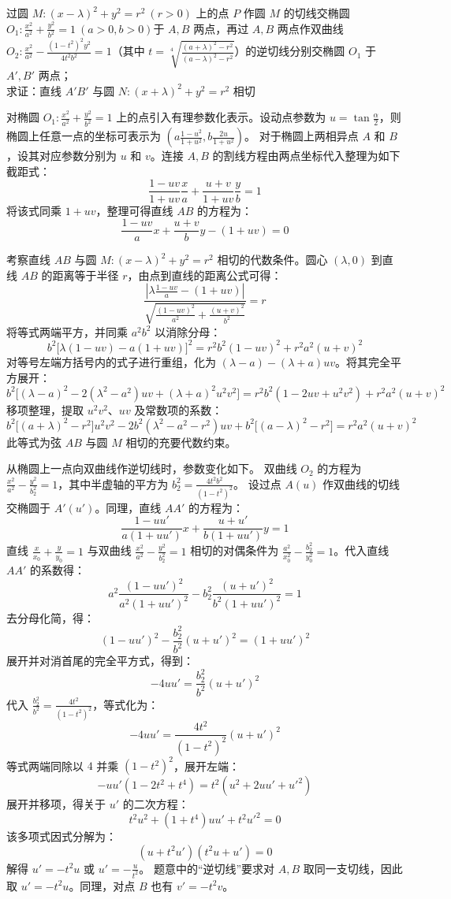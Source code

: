 \begin{exercise}
过圆 \(M: (x - \lambda)^2 + y^2 = r^2\ (r > 0)\) 上的点 \(P\) 作圆 \(M\) 的切线交椭圆$O_1: \frac{x^2}{a^2} + \frac{y^2}{b^2} = 1\ (a > 0, b > 0)$于 \(A,B\) 两点，再过 \(A,B\) 两点作双曲线$O_2: \frac{x^2}{a^2} - \frac{(1 - t^2)^2 y^2}{4 t^2 b^2} = 1$（其中 \(t = \sqrt[4]{\frac{(a + \lambda)^2 - r^2}{(a - \lambda)^2 - r^2}}\)）的逆切线分别交椭圆 \(O_1\) 于 \(A',B'\) 两点；\\
求证：直线 \(A'B'\) 与圆 \(N: (x + \lambda)^2 + y^2 = r^2\) 相切
\end{exercise}
\begin{solution}
对椭圆 $O_1: \frac{x^2}{a^2} + \frac{y^2}{b^2} = 1$ 上的点引入有理参数化表示。设动点参数为 $u = \tan\frac{\alpha}{2}$，则椭圆上任意一点的坐标可表示为 $\left( a\frac{1-u^2}{1+u^2}, b\frac{2u}{1+u^2} \right)$。
对于椭圆上两相异点 $A$ 和 $B$，设其对应参数分别为 $u$ 和 $v$。连接 $A, B$ 的割线方程由两点坐标代入整理为如下截距式：
\[ \frac{1-uv}{1+uv} \frac{x}{a} + \frac{u+v}{1+uv} \frac{y}{b} = 1 \]
将该式同乘 $1+uv$，整理可得直线 $AB$ 的方程为：
\[ \frac{1-uv}{a} x + \frac{u+v}{b} y - (1+uv) = 0 \]

考察直线 $AB$ 与圆 $M: (x - \lambda)^2 + y^2 = r^2$ 相切的代数条件。圆心 $(\lambda, 0)$ 到直线 $AB$ 的距离等于半径 $r$，由点到直线的距离公式可得：
\[ \frac{\left| \lambda \frac{1-uv}{a} - (1+uv) \right|}{\sqrt{\frac{(1-uv)^2}{a^2} + \frac{(u+v)^2}{b^2}}} = r \]
将等式两端平方，并同乘 $a^2 b^2$ 以消除分母：
\[ b^2 \big[ \lambda(1-uv) - a(1+uv) \big]^2 = r^2 b^2 (1-uv)^2 + r^2 a^2 (u+v)^2 \]
对等号左端方括号内的式子进行重组，化为 $(\lambda-a) - (\lambda+a)uv$。将其完全平方展开：
\[ b^2 \big[ (\lambda-a)^2 - 2(\lambda^2-a^2)uv + (\lambda+a)^2 u^2 v^2 \big] = r^2 b^2 (1 - 2uv + u^2 v^2) + r^2 a^2 (u+v)^2 \]
移项整理，提取 $u^2v^2$、$uv$ 及常数项的系数：
\[ b^2 \big[ (a+\lambda)^2 - r^2 \big] u^2 v^2 - 2b^2(\lambda^2-a^2-r^2) uv + b^2 \big[ (a-\lambda)^2 - r^2 \big] = r^2 a^2 (u+v)^2 \]
此等式为弦 $AB$ 与圆 $M$ 相切的充要代数约束。

从椭圆上一点向双曲线作逆切线时，参数变化如下。
双曲线 $O_2$ 的方程为 $\frac{x^2}{a^2} - \frac{y^2}{b_2^2} = 1$，其中半虚轴的平方为 $b_2^2 = \frac{4t^2 b^2}{(1-t^2)^2}$。
设过点 $A(u)$ 作双曲线的切线交椭圆于 $A'(u')$。同理，直线 $AA'$ 的方程为：
\[ \frac{1-uu'}{a(1+uu')} x + \frac{u+u'}{b(1+uu')} y = 1 \]
直线 $\frac{x}{x_0} + \frac{y}{y_0} = 1$ 与双曲线 $\frac{x^2}{a^2} - \frac{y^2}{b_2^2} = 1$ 相切的对偶条件为 $\frac{a^2}{x_0^2} - \frac{b_2^2}{y_0^2} = 1$。代入直线 $AA'$ 的系数得：
\[ a^2 \frac{(1-uu')^2}{a^2(1+uu')^2} - b_2^2 \frac{(u+u')^2}{b^2(1+uu')^2} = 1 \]
去分母化简，得：
\[ (1-uu')^2 - \frac{b_2^2}{b^2}(u+u')^2 = (1+uu')^2 \]
展开并对消首尾的完全平方式，得到：
\[ -4uu' = \frac{b_2^2}{b^2} (u+u')^2 \]
代入 $\frac{b_2^2}{b^2} = \frac{4t^2}{(1-t^2)^2}$，等式化为：
\[ -4uu' = \frac{4t^2}{(1-t^2)^2} (u+u')^2 \]
等式两端同除以 $4$ 并乘 $(1-t^2)^2$，展开左端：
\[ -uu' (1 - 2t^2 + t^4) = t^2 (u^2 + 2uu' + u'^2) \]
展开并移项，得关于 $u'$ 的二次方程：
\[ t^2 u^2 + (1+t^4) uu' + t^2 u'^2 = 0 \]
该多项式因式分解为：
\[ (u + t^2 u')(t^2 u + u') = 0 \]
解得 $u' = -t^2 u$ 或 $u' = -\frac{u}{t^2}$。
题意中的“逆切线”要求对 $A,B$ 取同一支切线，因此取 $u' = -t^2 u$。同理，对点 $B$ 也有 $v' = -t^2 v$。


\end{solution}
